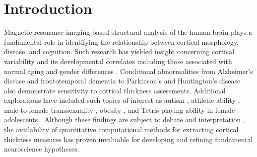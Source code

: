 \section{Introduction}

Magnetic resonance imaging-based 
structural analysis of the human brain plays a fundamental role
in identifying the relationship between cortical morphology, disease, and cognition.
Such research has yielded insight concerning
cortical variability and its developmental correlates
including those associated with normal aging \citep{Walhovd2013} and gender 
differences \citep{luders2006a}.
Conditional abnormalities from Alzheimer's disease and frontotemporal
dementia \citep{du2007,dickerson2009} to Parkinson's \citep{jubault2011}
and Huntington's disease \citep{rosas2005} also demonstrate sensitivity
to cortical thickness assessments.  Additional explorations have included
such topics of interest as autism \citep{chung2005}, athletic
ability \citep{wei2011}, male-to-female transsexuality \citep{luders2012},
obesity \citep{raji2010}, and Tetris-playing ability in female adolescents 
\citep{haier2009}.
Although these findings are subject to debate and interpretation 
\citep{gernsbacher2007}, the availability of quantitative
computational methods for extracting cortical thickness measures
has proven invaluable for developing and refining fundamental 
neuroscience hypotheses.


